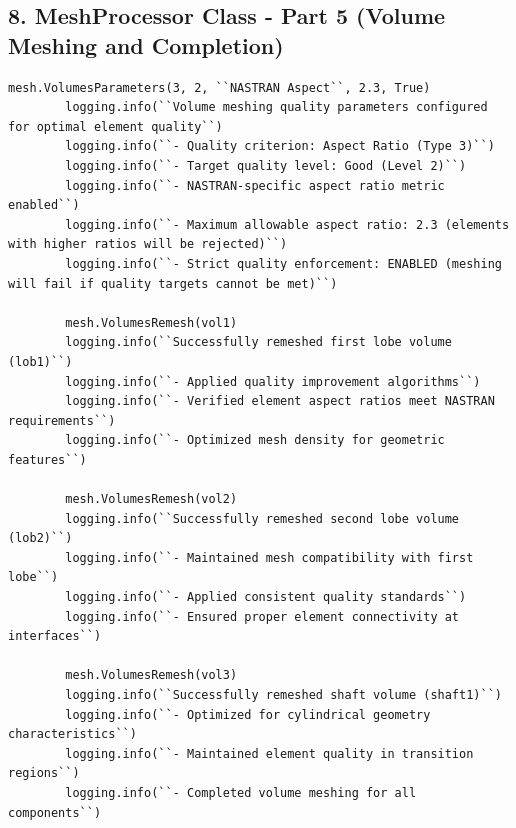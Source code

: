 \documentclass{book}
\begin{document}
\begin{itemize}[leftmargin=*,label=\textbullet]
\subsection*{8. MeshProcessor Class - Part 5 (Volume Meshing and Completion)}
\begin{lstlisting}[caption={MeshProcessor Class - Volume Meshing},label={lst:meshprocessor_5}]
        mesh.VolumesParameters(3, 2, ``NASTRAN Aspect``, 2.3, True)
        logging.info(``Volume meshing quality parameters configured for optimal element quality``)
        logging.info(``- Quality criterion: Aspect Ratio (Type 3)``)
        logging.info(``- Target quality level: Good (Level 2)``)
        logging.info(``- NASTRAN-specific aspect ratio metric enabled``)
        logging.info(``- Maximum allowable aspect ratio: 2.3 (elements with higher ratios will be rejected)``)
        logging.info(``- Strict quality enforcement: ENABLED (meshing will fail if quality targets cannot be met)``)

        mesh.VolumesRemesh(vol1)
        logging.info(``Successfully remeshed first lobe volume (lob1)``)
        logging.info(``- Applied quality improvement algorithms``)
        logging.info(``- Verified element aspect ratios meet NASTRAN requirements``)
        logging.info(``- Optimized mesh density for geometric features``)

        mesh.VolumesRemesh(vol2)
        logging.info(``Successfully remeshed second lobe volume (lob2)``)
        logging.info(``- Maintained mesh compatibility with first lobe``)
        logging.info(``- Applied consistent quality standards``)
        logging.info(``- Ensured proper element connectivity at interfaces``)

        mesh.VolumesRemesh(vol3)
        logging.info(``Successfully remeshed shaft volume (shaft1)``)
        logging.info(``- Optimized for cylindrical geometry characteristics``)
        logging.info(``- Maintained element quality in transition regions``)
        logging.info(``- Completed volume meshing for all components``)


\end{lstlisting}
\end{itemize}
\end{document}
